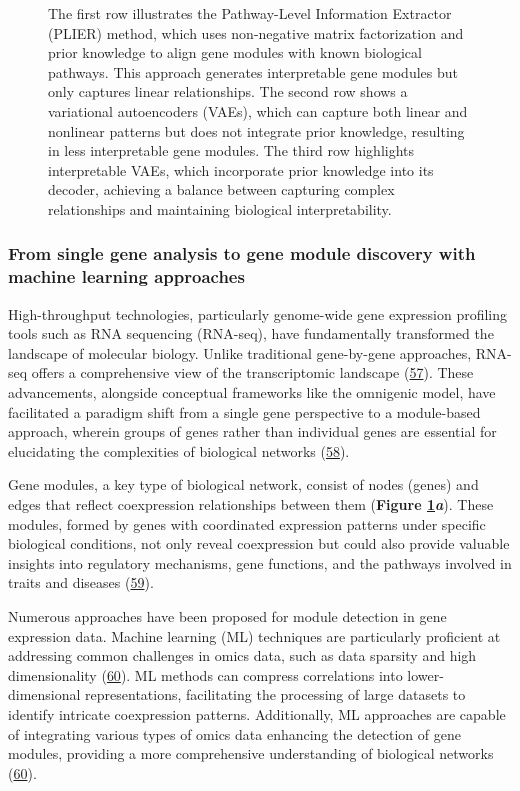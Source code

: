 \begin{figure}
{{The first row illustrates the Pathway-Level Information Extractor (PLIER) method, which uses non-negative matrix factorization and prior knowledge to align gene modules with known biological pathways.
This approach generates interpretable gene modules but only captures linear relationships.
The second row shows a variational autoencoders (VAEs), which can capture both linear and nonlinear patterns but does not integrate prior knowledge, resulting in less interpretable gene modules.
The third row highlights interpretable VAEs, which incorporate prior knowledge into its decoder, achieving a balance between capturing complex relationships and maintaining biological interpretability.}\label{fig:fig3}
}
\end{figure}

\hypertarget{from-single-gene-analysis-to-gene-module-discovery-with-machine-learning-approaches}{%
\subsubsection{From single gene analysis to gene module discovery with machine learning approaches}\label{from-single-gene-analysis-to-gene-module-discovery-with-machine-learning-approaches}}

High-throughput technologies, particularly genome-wide gene expression profiling tools such as RNA sequencing (RNA-seq), have fundamentally transformed the landscape of molecular biology.
Unlike traditional gene-by-gene approaches, RNA-seq offers a comprehensive view of the transcriptomic landscape (\protect\hyperlink{ref-Zm8nV5AC}{57}).
These advancements, alongside conceptual frameworks like the omnigenic model, have facilitated a paradigm shift from a single gene perspective to a module-based approach, wherein groups of genes rather than individual genes are essential for elucidating the complexities of biological networks (\protect\hyperlink{ref-SD886fuE}{58}).

Gene modules, a key type of biological network, consist of nodes (genes) and edges that reflect coexpression relationships between them (\textbf{Figure \ref{fig:fig3}\emph{a}}).
These modules, formed by genes with coordinated expression patterns under specific biological conditions, not only reveal coexpression but could also provide valuable insights into regulatory mechanisms, gene functions, and the pathways involved in traits and diseases (\protect\hyperlink{ref-QUI8V4RY}{59}).

Numerous approaches have been proposed for module detection in gene expression data.
Machine learning (ML) techniques are particularly proficient at addressing common challenges in omics data, such as data sparsity and high dimensionality (\protect\hyperlink{ref-K4KeL4gw}{60}).
ML methods can compress correlations into lower-dimensional representations, facilitating the processing of large datasets to identify intricate coexpression patterns.
Additionally, ML approaches are capable of integrating various types of omics data enhancing the detection of gene modules, providing a more comprehensive understanding of biological networks (\protect\hyperlink{ref-K4KeL4gw}{60}).

